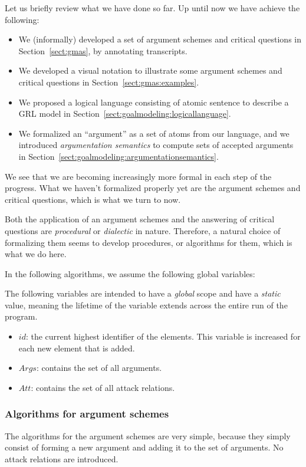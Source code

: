 Let us briefly review what we have done so far. Up until now we have achieve the following:
\begin{itemize}
\item We (informally) developed a set of argument schemes and critical questions in Section~\ref{sect:gmas}, by annotating transcripts.
\item We developed a visual notation to illustrate some argument schemes and critical questions in Section~\ref{sect:gmas:examples}.
\item We proposed a logical language consisting of atomic sentence to describe a GRL model in Section~\ref{sect:goalmodeling:logicallanguage}.
\item We formalized an ``argument'' as a set of atoms from our language, and we introduced \emph{argumentation semantics} to compute sets of accepted arguments in Section~\ref{sect:goalmodeling:argumentationsemantics}.
\end{itemize}

We see that we are becoming increasingly more formal in each step of the progress. What we haven't formalized properly yet are the argument schemes and critical questions, which is what we turn to now.

Both the application of an argument schemes and the answering of critical questions are \emph{procedural} or \emph{dialectic} in nature. Therefore, a natural choice of formalizing them seems to develop procedures, or algorithms for them, which is what we do here.

In the following algorithms, we assume the following global variables:

\begin{definition} The following variables are intended to have a \emph{global} scope and have a \emph{static} value, meaning the lifetime of the variable extends across the entire run of the program.
\begin{itemize}
\item $id$: the current highest identifier of the elements. This variable is increased for each new element that is added.
\item $Args$: contains the set of all arguments.
\item $Att$: contains the set of all attack relations.
\end{itemize}
\end{definition}


\subsubsection*{Algorithms for argument schemes}
The algorithms for the argument schemes are very simple, because they simply consist of forming a new argument and adding it to the set of arguments. No attack relations are introduced.

